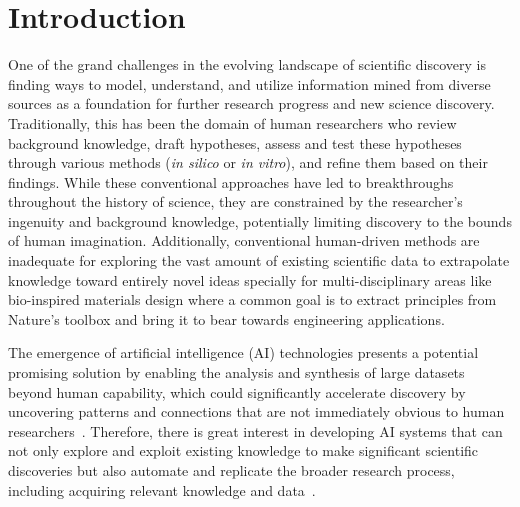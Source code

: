 \documentclass{article}
\begin{document}
\section{Introduction}
One of the grand challenges in the evolving landscape of scientific discovery is finding ways to model, understand, and utilize information mined from diverse sources as a foundation for further research progress and new science discovery. Traditionally, this has been the domain of human researchers who review background knowledge, draft hypotheses, assess and test these hypotheses through various methods (\textit{in silico} or \textit{in vitro}), and refine them based on their findings. While these conventional approaches have led to breakthroughs throughout the history of science, they are constrained by the researcher’s ingenuity and background knowledge, potentially limiting discovery to the bounds of human imagination. Additionally, conventional human-driven methods are inadequate for exploring the vast amount of existing scientific data to extrapolate knowledge toward entirely novel ideas specially for multi-disciplinary areas like bio-inspired materials design where a common goal is to extract principles from Nature's toolbox and bring it to bear towards engineering applications. 

The emergence of artificial intelligence (AI) technologies presents a potential promising solution by enabling the analysis and synthesis of large datasets beyond human capability, which could significantly accelerate discovery by uncovering patterns and connections that are not immediately obvious to human researchers~\cite{vanderZant2013GenerativeIntelligence,guo2021artificial,Liu2017MaterialsLearning,Hu2023DeepScience,Matsumoto2022MaterialsGeneration}. Therefore, there is great interest in developing AI systems that can not only explore and exploit existing knowledge to make significant scientific discoveries but also automate and replicate the broader research process, including acquiring relevant knowledge and data~\cite{buehler2024accelerating, https://doi.org/10.1002/adma.202405163, lu2024ai, https://doi.org/10.1002/adma.202310006, lei2024materials}.
\end{document}
